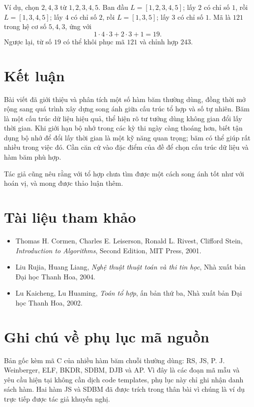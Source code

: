 \documentclass[11pt]{article}
\begin{document}
Ví dụ, chọn $2,4,3$ từ $1,2,3,4,5$. Ban đầu $L=[1,2,3,4,5]$; lấy $2$ có chỉ
số $1$, rồi $L=[1,3,4,5]$; lấy $4$ có chỉ số $2$, rồi $L=[1,3,5]$; lấy $3$ có
chỉ số $1$. Mã là $121$ trong hệ cơ số $5,4,3$, ứng với
\[
  1\cdot 4\cdot 3+2\cdot 3+1=19.
\]
Ngược lại, từ số $19$ có thể khôi phục mã $121$ và chỉnh hợp $243$.

\section{Kết luận}

Bài viết đã giới thiệu và phân tích một số hàm băm thường dùng, đồng thời mở
rộng sang quá trình xây dựng song ánh giữa cấu trúc tổ hợp và số tự nhiên.
Băm là một cấu trúc dữ liệu hiệu quả, thể hiện rõ tư tưởng dùng không gian đổi
lấy thời gian. Khi giới hạn bộ nhớ trong các kỳ thi ngày càng thoáng hơn, biết
tận dụng bộ nhớ để đổi lấy thời gian là một kỹ năng quan trọng; băm có thể
giúp rất nhiều trong việc đó. Cần căn cứ vào đặc điểm của đề để chọn cấu trúc
dữ liệu và hàm băm phù hợp.

Tác giả cũng nêu rằng với tổ hợp chưa tìm được một cách song ánh tốt như với
hoán vị, và mong được thảo luận thêm.

\section*{Tài liệu tham khảo}

\begin{itemize}
  \item Thomas H. Cormen, Charles E. Leiserson, Ronald L. Rivest, Clifford
  Stein, \textit{Introduction to Algorithms}, Second Edition, MIT Press, 2001.
  \item Liu Rujia, Huang Liang, \textit{Nghệ thuật thuật toán và thi tin học},
  Nhà xuất bản Đại học Thanh Hoa, 2004.
  \item Lu Kaicheng, Lu Huaming, \textit{Toán tổ hợp}, ấn bản thứ ba, Nhà xuất
  bản Đại học Thanh Hoa, 2002.
\end{itemize}

\appendix
\section{Ghi chú về phụ lục mã nguồn}

Bản gốc kèm mã C của nhiều hàm băm chuỗi thường dùng: RS, JS, P. J.
Weinberger, ELF, BKDR, SDBM, DJB và AP. Vì đây là các đoạn mã mẫu và yêu cầu
hiện tại không cần dịch code templates, phụ lục này chỉ ghi nhận danh sách
hàm. Hai hàm JS và SDBM đã được trích trong thân bài vì chúng là ví dụ trực
tiếp được tác giả khuyến nghị.
\end{document}
